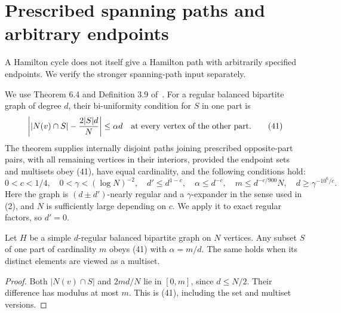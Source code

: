 \section{Prescribed spanning paths and arbitrary endpoints}
\label{sec:paths}
A Hamilton cycle does not itself give a Hamilton path with
arbitrarily specified endpoints.
We verify the stronger spanning-path input separately.

We use Theorem 6.4 and Definition 3.9 of~\cite{BJ}.
For a regular balanced bipartite graph of degree \(d\), their
bi-uniformity condition for \(S\) in one part is
\[
 \left||N(v)\cap S|-\frac{2|S|d}{N}\right|\leq\alpha d
 \quad\hbox{at every vertex of the other part}.              \tag{41}
\]
The theorem supplies internally disjoint paths joining prescribed
opposite-part pairs, with all remaining vertices in their interiors,
provided the endpoint sets and multisets obey (41), have equal
cardinality, and the following conditions hold:
\[
 0<c<1/4,\quad 0<\gamma<(\log N)^{-2},\quad
 d'\leq d^{1-c},\quad\alpha\leq d^{-c},\quad
 m\leq d^{-c/900}N,\quad d\geq\gamma^{-10^6/c}.               \tag{42}
\]
Here the graph is \((d\pm d')\)-nearly regular and a
\(\gamma\)-expander in the sense used in (2), and \(N\)
is sufficiently large depending on \(c\).
We apply it to exact regular factors, so \(d'=0\).

\begin{lemma}
\label{lem:smallendpoints}
Let \(H\) be a simple \(d\)-regular balanced bipartite graph
on \(N\) vertices.
Any subset \(S\) of one part of cardinality \(m\) obeys
(41) with \(\alpha=m/d\).
The same holds when its distinct elements are viewed as a multiset.
\end{lemma}
\begin{proof}
Both \(|N(v)\cap S|\) and \(2md/N\) lie in \([0,m]\),
since \(d\leq N/2\). Their difference has modulus at most \(m\).
This is (41), including the set and multiset versions.
\end{proof}

